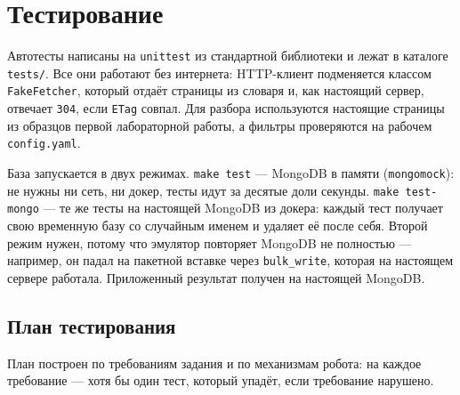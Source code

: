 \section{Тестирование}
\label{sec:tests}

Автотесты написаны на \texttt{unittest} из стандартной библиотеки и лежат в
каталоге \texttt{tests/}. Все они работают без интернета: HTTP-клиент подменяется
классом \texttt{FakeFetcher}, который отдаёт страницы из словаря и, как
настоящий сервер, отвечает \texttt{304}, если \texttt{ETag} совпал. Для разбора
используются настоящие страницы из образцов первой лабораторной работы, а фильтры
проверяются на рабочем \texttt{config.yaml}.

База запускается в двух режимах. \texttt{make test} --- MongoDB в памяти
(\texttt{mongomock}): не нужны ни сеть, ни докер, тесты идут за десятые доли
секунды. \texttt{make test-mongo} --- те же тесты на настоящей MongoDB из
докера: каждый тест получает свою временную базу со случайным именем и удаляет
её после себя. Второй режим нужен, потому что эмулятор повторяет MongoDB не
полностью --- например, он падал на пакетной вставке через \texttt{bulk\_write},
которая на настоящем сервере работала. Приложенный результат получен на
настоящей MongoDB.

\subsection*{План тестирования}

План построен по требованиям задания и по механизмам робота: на каждое
требование --- хотя бы один тест, который упадёт, если требование нарушено.

